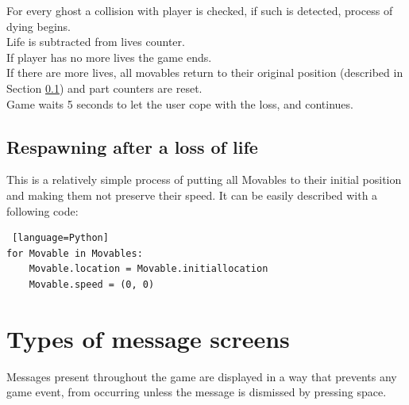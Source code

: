 \documentclass[11pt,a4paper]{report}
\newcommand{\dsubsection}[1]{\FloatBarrier \subsection{#1}}
\begin{document}
				For every ghost a collision with player is checked, if such is detected, process of dying begins.\\
				Life is subtracted from lives counter.\\
				If player has no more lives the game ends.\\
				If there are more lives, all movables return to their original position (described in Section \ref{respawning})
				and part counters are reset.\\
				Game waits 5 seconds to let the user cope with the loss, and continues.
			\dsubsection{Respawning after a loss of life}
				\label{respawning}
				This is a relatively simple process of putting all Movables to their initial position and making them not preserve their speed. It can be easily described with a following code:
				\begin{lstlisting} [language=Python]
for Movable in Movables:
    Movable.location = Movable.initiallocation
    Movable.speed = (0, 0)
				\end{lstlisting}
		\section{Types of message screens}
			\label{typesofscreens}
			Messages present throughout the game are displayed in a way that prevents any game event, from occurring unless the message is dismissed by pressing space.
			
\end{document}
